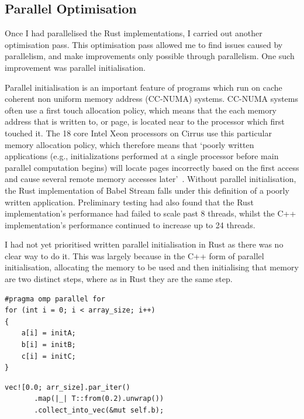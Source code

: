 

\subsection{Parallel Optimisation}
Once I had parallelised the Rust implementations, I carried out another optimisation pass. This optimisation pass allowed me to find issues caused by parallelism, and make improvements only possible through parallelism. One such improvement was parallel initialisation.

Parallel initialisation is an important feature of programs which run on cache coherent non uniform memory address (CC-NUMA) systems. CC-NUMA systems often use a first touch allocation policy, which means that the each memory address that is written to, or page, is located near to the processor which first touched it. The 18 core Intel Xeon processors on Cirrus use this particular memory allocation policy, which therefore means that `poorly written applications (e.g., initializations  performed  at  a  single  processor  before  main  parallel computation  begins)  will  locate  pages  incorrectly based  on  the  first  access  and  cause  several  remote memory accesses later'~\cite{Bhuyan:2000}. Without parallel initialisation, the Rust implementation of Babel Stream falls under this definition of a poorly written application. Preliminary testing had also found that the Rust implementation's performance had failed to scale past 8 threads, whilst the C++ implementation's performance continued to increase up to 24 threads. 

I had not yet prioritised written parallel initialisation in Rust as there was no clear way to do it. This was largely because in the C++ form of parallel initialisation, allocating the memory to be used and then initialising that memory are two distinct steps, where as in Rust they are the same step.

\noindent\begin{minipage}{.48\textwidth}
\begin{code}
\begin{verbatim}
#pragma omp parallel for
for (int i = 0; i < array_size; i++)
{
    a[i] = initA;
    b[i] = initB;
    c[i] = initC;
}
\end{verbatim}
\label{lst:serialInit}
\end{code}
\end{minipage}\hfill
\begin{minipage}{.48\textwidth}
\begin{code}
\begin{verbatim}
vec![0.0; arr_size].par_iter()
       .map(|_| T::from(0.2).unwrap())
       .collect_into_vec(&mut self.b);
\end{verbatim}
\label{lst:parInit}
\end{code}
\end{minipage}

